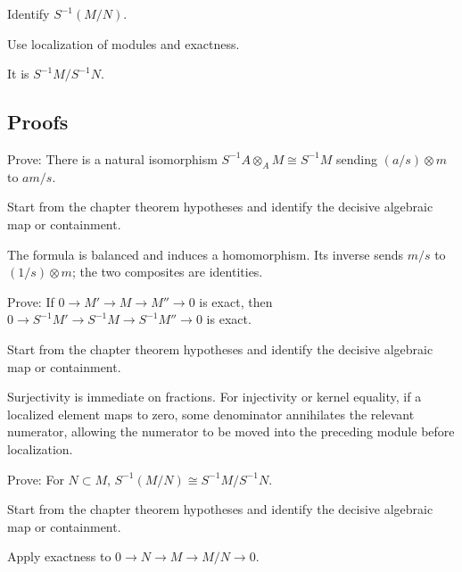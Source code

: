 \begin{exercise}\label{exr:v07-expand-05}
Identify $S^{-1}(M/N)$.
\end{exercise}
\begin{hint}
Use localization of modules and exactness.
\end{hint}
\begin{solution}
It is $S^{-1}M/S^{-1}N$.
\end{solution}

\subsection*{Proofs}

\begin{exercise}\label{exr:v07-expand-06}
Prove: There is a natural isomorphism $S^{-1}A\otimes_A M\cong S^{-1}M$ sending $(a/s)\otimes m$ to $am/s$.
\end{exercise}
\begin{hint}
Start from the chapter theorem hypotheses and identify the decisive algebraic map or containment.
\end{hint}
\begin{solution}
The formula is balanced and induces a homomorphism. Its inverse sends $m/s$ to $(1/s)\otimes m$; the two composites are identities.
\end{solution}

\begin{exercise}\label{exr:v07-expand-07}
Prove: If $0\to M'\to M\to M''\to0$ is exact, then $0\to S^{-1}M'\to S^{-1}M\to S^{-1}M''\to0$ is exact.
\end{exercise}
\begin{hint}
Start from the chapter theorem hypotheses and identify the decisive algebraic map or containment.
\end{hint}
\begin{solution}
Surjectivity is immediate on fractions. For injectivity or kernel equality, if a localized element maps to zero, some denominator annihilates the relevant numerator, allowing the numerator to be moved into the preceding module before localization.
\end{solution}

\begin{exercise}\label{exr:v07-expand-08}
Prove: For $N\subset M$, $S^{-1}(M/N)\cong S^{-1}M/S^{-1}N$.
\end{exercise}
\begin{hint}
Start from the chapter theorem hypotheses and identify the decisive algebraic map or containment.
\end{hint}
\begin{solution}
Apply exactness to $0\to N\to M\to M/N\to0$.
\end{solution}

